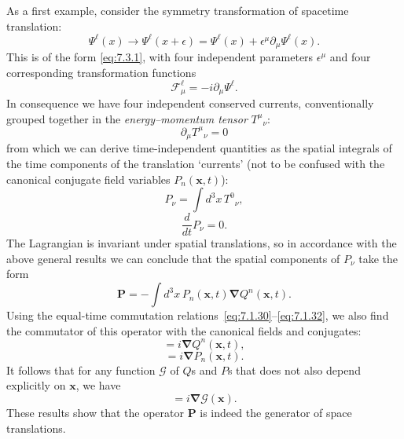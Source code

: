 As a first example, consider the symmetry transformation of spacetime
translation:
\begin{equation}
\Psi^\ell(x)\longrightarrow\Psi^\ell(x+\epsilon)
=\Psi^\ell(x)+\epsilon^\mu\partial_\mu\Psi^\ell(x).
\tag{7.3.20}\label{eq:7.3.20}
\end{equation}
This is of the form \eqref{eq:7.3.1}, with four independent parameters $\epsilon^\mu$
and four corresponding transformation functions
\begin{equation}
\mathcal{F}^\ell_\mu=-i\partial_\mu\Psi^\ell.
\tag{7.3.21}\label{eq:7.3.21}
\end{equation}
In consequence we have four independent conserved currents, conventionally
grouped together in the \emph{energy--momentum tensor} $T^\mu{}_\nu$:
\begin{equation}
\partial_\mu T^\mu{}_\nu=0
\tag{7.3.22}\label{eq:7.3.22}
\end{equation}
from which we can derive time-independent quantities as the spatial integrals
of the time components of the translation `currents' (not to be confused with
the canonical conjugate field variables $P_n(\mathbf{x},t)$):
\begin{equation}
P_\nu=\int d^3x\,T^0{}_\nu,
\tag{7.3.23}\label{eq:7.3.23}
\end{equation}
\begin{equation}
\frac{d}{dt}P_\nu=0.
\tag{7.3.24}\label{eq:7.3.24}
\end{equation}
The Lagrangian is invariant under spatial translations, so in accordance with
the above general results we can conclude that the spatial components of
$P_\nu$ take the form
\begin{equation}
\mathbf{P}=-\int d^3x\,P_n(\mathbf{x},t)\boldsymbol{\nabla}Q^n(\mathbf{x},t).
\tag{7.3.25}\label{eq:7.3.25}
\end{equation}
Using the equal-time commutation relations~\eqref{eq:7.1.30}--\eqref{eq:7.1.32}, we also find the
commutator of this operator with the canonical fields and conjugates:
\begin{equation}
[\mathbf{P},Q^n(\mathbf{x},t)]=i\boldsymbol{\nabla}Q^n(\mathbf{x},t),
\tag{7.3.26}\label{eq:7.3.26}
\end{equation}
\begin{equation}
[\mathbf{P},P_n(\mathbf{x},t)]=i\boldsymbol{\nabla}P_n(\mathbf{x},t).
\tag{7.3.27}\label{eq:7.3.27}
\end{equation}
It follows that for any function $\mathcal{G}$ of $Q$s and $P$s that does not
also depend explicitly on $\mathbf{x}$, we have
\begin{equation}
[\mathbf{P},\mathcal{G}(\mathbf{x})]=i\boldsymbol{\nabla}\mathcal{G}(\mathbf{x}).
\tag{7.3.28}\label{eq:7.3.28}
\end{equation}
These results show that the operator $\mathbf{P}$ is indeed the generator of
space translations.

